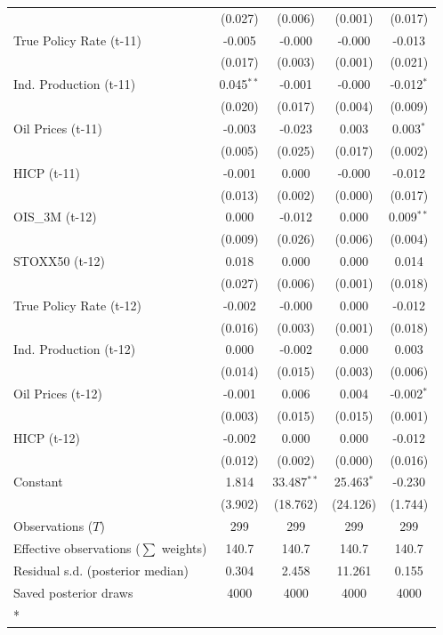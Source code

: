 \begin{longtable}[t]{lcccc}
 & (0.027) & (0.006) & (0.001) & (0.017)\\
True Policy Rate (t-11) & -0.005 & -0.000 & -0.000 & -0.013\\
 & (0.017) & (0.003) & (0.001) & (0.021)\\
Ind. Production (t-11) & 0.045$^{**}$ & -0.001 & -0.000 & -0.012$^{*}$\\
 & (0.020) & (0.017) & (0.004) & (0.009)\\
Oil Prices (t-11) & -0.003 & -0.023 & 0.003 & 0.003$^{*}$\\
 & (0.005) & (0.025) & (0.017) & (0.002)\\
HICP (t-11) & -0.001 & 0.000 & -0.000 & -0.012\\
 & (0.013) & (0.002) & (0.000) & (0.017)\\
OIS\_3M (t-12) & 0.000 & -0.012 & 0.000 & 0.009$^{**}$\\
 & (0.009) & (0.026) & (0.006) & (0.004)\\
STOXX50 (t-12) & 0.018 & 0.000 & 0.000 & 0.014\\
 & (0.027) & (0.006) & (0.001) & (0.018)\\
True Policy Rate (t-12) & -0.002 & -0.000 & 0.000 & -0.012\\
 & (0.016) & (0.003) & (0.001) & (0.018)\\
Ind. Production (t-12) & 0.000 & -0.002 & 0.000 & 0.003\\
 & (0.014) & (0.015) & (0.003) & (0.006)\\
Oil Prices (t-12) & -0.001 & 0.006 & 0.004 & -0.002$^{*}$\\
 & (0.003) & (0.015) & (0.015) & (0.001)\\
HICP (t-12) & -0.002 & 0.000 & 0.000 & -0.012\\
 & (0.012) & (0.002) & (0.000) & (0.016)\\
Constant & 1.814 & 33.487$^{**}$ & 25.463$^{*}$ & -0.230\\
 & (3.902) & (18.762) & (24.126) & (1.744)\\
\midrule
Observations ($T$) & 299 & 299 & 299 & 299\\
Effective observations ($\sum$ weights) & 140.7 & 140.7 & 140.7 & 140.7\\
Residual s.d. (posterior median) & 0.304 & 2.458 & 11.261 & 0.155\\
Saved posterior draws & 4000 & 4000 & 4000 & 4000\\*
\end{longtable}
\endgroup{}

\begingroup\fontsize{7}{9}\selectfont

